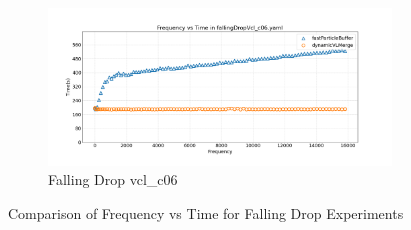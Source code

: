 \begin{figure}[htbp]
    \begin{subfigure}[b]{\textwidth}
        \centering
        \includegraphics[width=0.9\linewidth]{graphs/fallingDrop/normalExperiments/freq/vclc06.png}
        \vspace{-0.5em}
        \caption{\scriptsize Falling Drop vcl\_c06}
        \label{fig:vclc06constantVelocityCube}
    \end{subfigure}

    \vspace{1em}
    \caption{Comparison of Frequency vs Time for Falling Drop Experiments}
    \label{fig:mainFallingDrop}
\end{figure}



